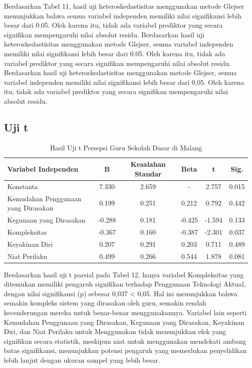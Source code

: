     Berdasarkan Tabel 11, hasil uji heteroskedastisitas menggunakan metode Glejser menunjukkan bahwa semua variabel independen memiliki nilai signifikansi lebih besar dari 0.05. Oleh karena itu, tidak ada variabel prediktor yang secara signifikan mempengaruhi nilai absolut residu. Berdasarkan hasil uji heteroskedastisitas menggunakan metode Glejser, semua variabel independen memiliki nilai signifikansi lebih besar dari 0.05. Oleh karena itu, tidak ada variabel prediktor yang secara signifikan mempengaruhi nilai absolut residu. Berdasarkan hasil uji heteroskedastisitas menggunakan metode Glejser, semua variabel independen memiliki nilai signifikansi lebih besar dari 0,05. Oleh karena itu, tidak ada variabel prediktor yang secara signifikan mempengaruhi nilai absolut residu.

\subsection{Uji t}

    \begin{table}[H]
        \centering
        \caption{Hasil Uji t Persepsi Guru Sekolah Dasar di Malang}
        \label{tab:uji-t}
        \begin{tabularx}{\textwidth}{lccccc}
            \toprule
            \textbf{Variabel Independen} & \textbf{B} & \textbf{Kesalahan Standar} & \textbf{Beta} & \textbf{t} & \textbf{Sig.} \\
            \midrule
            Konstanta & 7.330 & 2.659 & - & 2.757 & 0.015 \\
            Kemudahan Penggunaan yang Dirasakan & 0.199 & 0.251 & 0.212 & 0.792 & 0.442 \\
            Kegunaan yang Dirasakan & -0.288 & 0.181 & -0.425 & -1.594 & 0.133 \\
            Kompleksitas & -0.367 & 0.160 & -0.387 & -2.301 & 0.037 \\
            Keyakinan Diri & 0.207 & 0.291 & 0.203 & 0.711 & 0.489 \\
            Niat Perilaku & 0.499 & 0.266 & 0.544 & 1.878 & 0.081 \\
            \bottomrule
        \end{tabularx}
    \end{table}

    Berdasarkan hasil uji t parsial pada Tabel 12, hanya variabel Kompleksitas yang ditemukan memiliki pengaruh signifikan terhadap Penggunaan Teknologi Aktual, dengan nilai signifikansi (p) sebesar 0,037 < 0,05. Hal ini menunjukkan bahwa semakin kompleks sistem yang dirasakan oleh guru, semakin rendah kecenderungan mereka untuk benar-benar menggunakannya. Variabel lain seperti Kemudahan Penggunaan yang Dirasakan, Kegunaan yang Dirasakan, Keyakinan Diri, dan Niat Perilaku untuk Menggunakan tidak menunjukkan efek yang signifikan secara statistik, meskipun niat untuk menggunakan mendekati ambang batas signifikansi, menunjukkan potensi pengaruh yang memerlukan penyelidikan lebih lanjut dengan ukuran sampel yang lebih besar.

